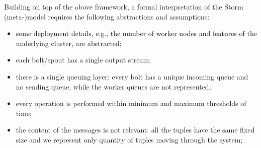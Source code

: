 Building on top of the above framework,  a formal interpretation of the Storm (meta-)model requires the following abstractions and assumptions:
\begin{itemize}
	\item some deployment details, e.g., the number of worker nodes and features of the underlying cluster, are abstracted;
	\item each bolt/spout has a single output stream;
	\item %
	there is a single queuing layer: every bolt has a unique incoming queue and no sending queue, while the worker queues are not represented;
	\item every operation is performed within minimum and maximum thresholds of time;
	\item %
	the content of the messages is not relevant: all the tuples have the same fixed size and we represent only quantity of tuples moving through the system;
\end{itemize}

